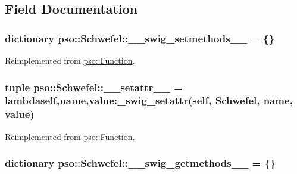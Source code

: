 \subsection{Field Documentation}
\hypertarget{classpso_1_1Schwefel_c3b3a6c2afe3fd3d83656d02402cad2e}{
\subsubsection{\setlength{\rightskip}{0pt plus 5cm}dictionary {\bf pso::Schwefel::\_\-\_\-swig\_\-setmethods\_\-\_\-} = \{\}}}
\label{classpso_1_1Schwefel_c3b3a6c2afe3fd3d83656d02402cad2e}




Reimplemented from \hyperlink{classpso_1_1Function_2334bfe507115d58047f67960dde71d3}{pso::Function}.\hypertarget{classpso_1_1Schwefel_cf6df02d5b7d6b9dc27ea126a521c53d}{
\subsubsection{\setlength{\rightskip}{0pt plus 5cm}tuple {\bf pso::Schwefel::\_\-\_\-setattr\_\-\_\-} = lambdaself,name,value:\_\-swig\_\-setattr(self, {\bf Schwefel}, name, value)}}
\label{classpso_1_1Schwefel_cf6df02d5b7d6b9dc27ea126a521c53d}




Reimplemented from \hyperlink{classpso_1_1Function_cd8775cf6aadc3fdf4e6d82158ef10fb}{pso::Function}.\hypertarget{classpso_1_1Schwefel_069965b80402f68af7a664aea8aea22f}{
\subsubsection{\setlength{\rightskip}{0pt plus 5cm}dictionary {\bf pso::Schwefel::\_\-\_\-swig\_\-getmethods\_\-\_\-} = \{\}}}
\label{classpso_1_1Schwefel_069965b80402f68af7a664aea8aea22f}




